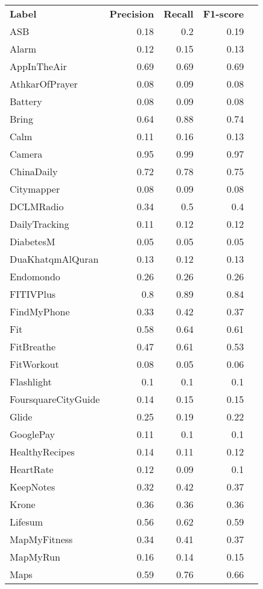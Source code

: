 \begin{tabular}{lrrrr}
    \textbf{Label} & \textbf{Precision} & \textbf{Recall} & \textbf{F1-score} \\
    ASB & 0.18 & 0.2 & 0.19 \\
    Alarm & 0.12 & 0.15 & 0.13 \\
    AppInTheAir & 0.69 & 0.69 & 0.69 \\
    AthkarOfPrayer & 0.08 & 0.09 & 0.08 \\
    Battery & 0.08 & 0.09 & 0.08 \\
    Bring & 0.64 & 0.88 & 0.74 \\
    Calm & 0.11 & 0.16 & 0.13 \\
    Camera & 0.95 & 0.99 & 0.97 \\
    ChinaDaily & 0.72 & 0.78 & 0.75 \\
    Citymapper & 0.08 & 0.09 & 0.08 \\
    DCLMRadio & 0.34 & 0.5 & 0.4 \\
    DailyTracking & 0.11 & 0.12 & 0.12 \\
    DiabetesM & 0.05 & 0.05 & 0.05 \\
    DuaKhatqmAlQuran & 0.13 & 0.12 & 0.13 \\
    Endomondo & 0.26 & 0.26 & 0.26 \\
    FITIVPlus & 0.8 & 0.89 & 0.84 \\
    FindMyPhone & 0.33 & 0.42 & 0.37 \\
    Fit & 0.58 & 0.64 & 0.61 \\
    FitBreathe & 0.47 & 0.61 & 0.53 \\
    FitWorkout & 0.08 & 0.05 & 0.06 \\
    Flashlight & 0.1 & 0.1 & 0.1 \\
    FoursquareCityGuide & 0.14 & 0.15 & 0.15 \\
    Glide & 0.25 & 0.19 & 0.22 \\
    GooglePay & 0.11 & 0.1 & 0.1 \\
    HealthyRecipes & 0.14 & 0.11 & 0.12 \\
    HeartRate & 0.12 & 0.09 & 0.1 \\
    KeepNotes & 0.32 & 0.42 & 0.37 \\
    Krone & 0.36 & 0.36 & 0.36 \\
    Lifesum & 0.56 & 0.62 & 0.59 \\
    MapMyFitness & 0.34 & 0.41 & 0.37 \\
    MapMyRun & 0.16 & 0.14 & 0.15 \\
    Maps & 0.59 & 0.76 & 0.66 \\

\end{tabular}
